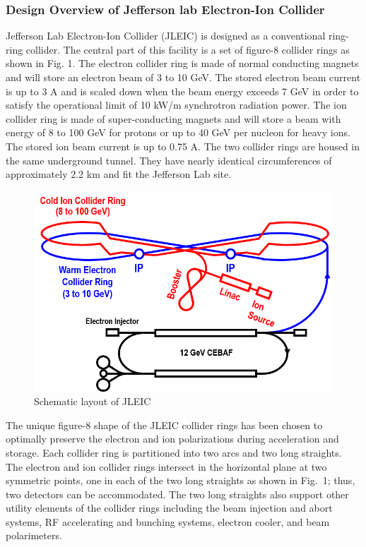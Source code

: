 \subsubsection{Design Overview of Jefferson lab Electron-Ion Collider}
Jefferson Lab Electron-Ion Collider (JLEIC) is designed as a conventional ring-ring collider.
\cite{Abeyratne:2015pma} The central part of this facility is a set of figure-8 collider rings as shown in Fig. 1. The electron collider ring is made of normal conducting magnets and will store an electron beam of 3 to 10 GeV. The stored electron beam current is up to 3 A and is scaled down when the beam energy exceeds 7 GeV in order to satisfy the operational limit of 10 kW/m synchrotron radiation power. The ion collider ring is made of super-conducting magnets and will store a beam with energy of 8 to 100 GeV for protons or up to 40 GeV per nucleon for heavy ions. The stored ion beam current is up to 0.75 A. The two collider rings are housed in the same underground tunnel. They have nearly identical circumferences of approximately 2.2 km and fit the Jefferson Lab site.

\begin{figure}[!htb]
	\centering
	\includegraphics[width=.75\textwidth]{../../img/jleic_schematic.png}
	\caption{Schematic layout of JLEIC}
	\label{fig:jleic1}
\end{figure}

The unique figure-8 shape of the JLEIC collider rings has been chosen to optimally preserve the electron and ion polarizations during acceleration and storage. \cite{Kondratenko:2016eqn}  Each collider ring is partitioned into two arcs and two long straights. The electron and ion collider rings intersect in the horizontal plane at two symmetric points, one in each of the two long straights as shown in Fig. 1; thus, two detectors can be accommodated. The two long straights also support other utility elements of the collider rings including the beam injection and abort systems, RF accelerating and bunching systems, electron cooler, and beam polarimeters.

